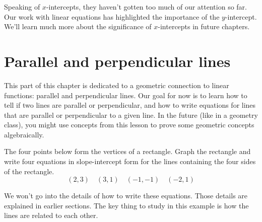 Speaking of $x$-intercepts, they haven't gotten too much of our attention so far. Our work with linear equations has highlighted the importance of the $y$-intercept. We'll learn much more about the significance of $x$-intercepts in future chapters.


\section{Parallel and perpendicular lines}
\label{sec:parallelperpendicular}

This part of this chapter is dedicated to a geometric connection to linear functions: parallel and perpendicular lines. Our goal for now is to learn how to tell if two lines are parallel or perpendicular, and how to write equations for lines that are parallel or perpendicular to a given line. In the future (like in a geometry class), you might use concepts from this lesson to prove some geometric concepts algebraically.


\begin{boxexplore}
The four points below form the vertices of a rectangle. Graph the rectangle and write four equations in slope-intercept form for the lines containing the four sides of the rectangle.
\[(2,3) \quad (3,1) \quad (-1,-1) \quad (-2,1)\]
\end{boxexplore} %

We won't go into the details of how to write these equations. Those details are explained in earlier sections. The key thing to study in this example is how the lines are related to each other.


